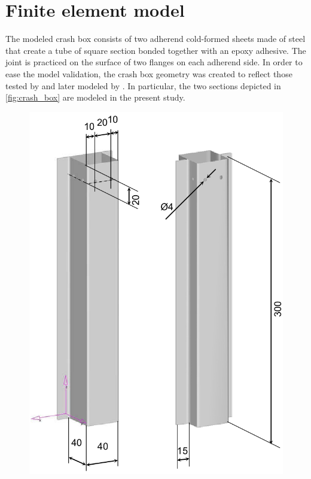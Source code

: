 \documentclass[cmfonts]{witpress}
\begin{document}
\section{Finite element model}
The modeled crash box consists of two adherend cold-formed sheets made of steel that create a tube of square section bonded together with an epoxy adhesive. The joint is practiced on the surface of two flanges on each adherend side. In order to ease the model validation, the crash box geometry was created to reflect those tested by \cite{Peroni2009} and later modeled by \cite{Scattina2011}. In particular, the two sections depicted in \cref{fig:crash_box} are modeled in the present study.
\begin{figure}[ht]
  \centering
  \begin{minipage}[b]{.48\linewidth}
    \centering
    \includegraphics[width=\linewidth]{figures/IMG_CUTRES/medidas_cb}

\end{minipage}
\end{figure}
\end{document}
